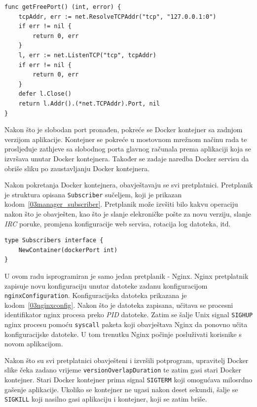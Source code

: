 \begin{lstlisting}[float=h]
func getFreePort() (int, error) {
	tcpAddr, err := net.ResolveTCPAddr("tcp", "127.0.0.1:0")
	if err != nil {
		return 0, err
	}
	l, err := net.ListenTCP("tcp", tcpAddr)
	if err != nil {
		return 0, err
	}
	defer l.Close()
	return l.Addr().(*net.TCPAddr).Port, nil
}
\end{lstlisting}

Nakon što je slobodan port pronađen, pokreće se Docker kontejner sa zadnjom verzijom aplikacije.
Kontejner se pokreće u mostovnom mrežnom načinu rada te prosljeđuje zathjeve sa slobodnog porta
glavnog računala prema aplikaciji koja se izvršava unutar Docker kontejnera. Također se zadaje
naredba Docker servisu da obriše sliku po zaustavljanju Docker kontejnera.

Nakon pokretanja Docker kontejnera, obavještavaju se svi pretplatnici. Pretplanik je struktura
opisana \texttt{Subscriber} sučeljem, koji je prikazan kodom~\ref{03manager_subscriber}. Pretplanik
može izvšiti bilo kakvu operaciju nakon što je obavješten, kao što je slanje elekroničke pošte za
novu verziju, slanje \textit{IRC} poruke, promjena konfiguracije web servisa, rotacija log datoteka,
itd.

\begin{lstlisting}[float=h]
type Subscribers interface {
	NewContainer(dockerPort int)
}
\end{lstlisting}

U ovom radu isprogramiran je samo jedan pretplanik - Nginx. Nginx pretplatnik zapisuje novu
konfiguraciju unutar datoteke zadanu konfiguracijom \texttt{nginxConfiguration}. Konfiguracijska
datoteka prikazana je kodom~\ref{03nginxconfig}. Nakon što je datoteka zapisana, učitava se procesni
identifikator nginx procesa preko \textit{PID} datoteke. Zatim se šalje Unix signal \texttt{SIGHUP}
nginx procesu pomoću \texttt{syscall} paketa koji obavještava Nginx da ponovno učita konfiguracijske
datoteke. U tom trenutku Nginx počinje posluživati korisnike s novom aplikacijom.

Nakon što su svi pretplatnici obavješteni i izvršili potprogram, upravitelj Docker slike čeka zadano
vrijeme \texttt{versionOverlapDuration} te zatim gasi stari Docker kontejner. Stari Docker kontejner
prima signal \texttt{SIGTERM} koji omogućava milosrdno gašenje aplikacije. Ukoliko se kontejner ne
ugasi nakon deset sekundi, šalje se \texttt{SIGKILL} koji nasilno gasi aplikaciju i kontejner, koji
se zatim briše.

